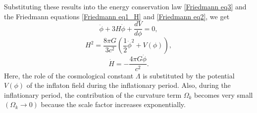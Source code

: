 \documentclass[12pt]{article}
\numberwithin{equation}{section}
\begin{document}
Substituting these results into the energy conservation law \eqref{Friedmann eq3} and the Friedmann equations \eqref{Friedmann eq1_H} and \eqref{Friedmann eq2}, we get
\begin{equation}\label{ECL_phi}
    \ddot{\phi} + 3H\dot{\phi} + \frac{dV}{d\phi} = 0,
\end{equation}
\begin{equation}\label{Friedmann1_phi}
    H^2 = \frac{8\pi G}{3c^2}\left( \frac{1}{2}\dot{\phi}^2 + V(\phi) \right),
\end{equation}
\begin{equation}\label{Friedmann2_phi}
    \dot{H} = -\frac{4\pi G\dot{\phi}}{c^2}.
\end{equation}
Here, the role of the cosmological constant $\Lambda$ is substituted by the potential $V(\phi)$ of the inflaton field during the inflationary period. Also, during the inflationary period, the contribution of the curvature term $\Omega_k$ becomes very small $(\Omega_k \to 0)$ because the scale factor increases exponentially.
\end{document}

